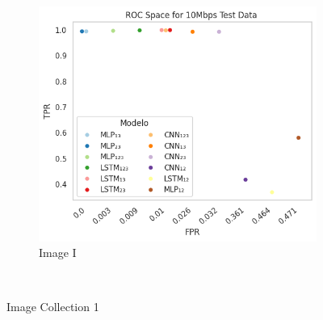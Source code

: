 \documentclass[a4paper,fleqn]{cas-sc}
\begin{document}
\begin{figure}
\begin{minipage}[t]{0.46\textwidth}
			~
			\begin{subfigure}[t]{0.33\textwidth}
				\includegraphics[draft=false, width=\textwidth]{./figs/ROC-Space-Test-Data-10Mbps.png} 
				\caption{Image I}
			\label{fig:1c}
			\end{subfigure}%
			~
        \hfill
		\caption{ Image Collection 1\hspace{10cm}}
		\label{fig:Pasnatsch}
	

\end{minipage}
\end{figure}
\end{document}
